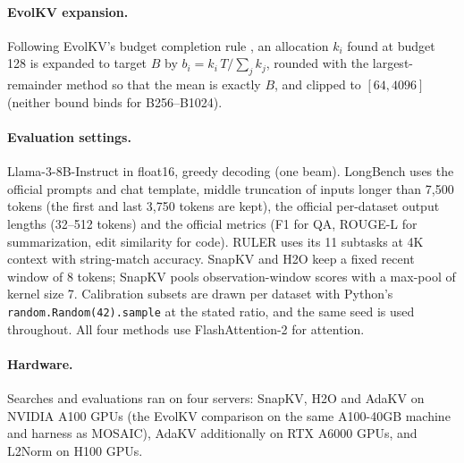 \paragraph{EvolKV expansion.} Following EvolKV's budget completion rule \citep{yu2025evolkv}, an allocation $k_i$ found at budget 128 is expanded to target $B$ by $b_i = k_i\,T / \sum_j k_j$, rounded with the largest-remainder method so that the mean is exactly $B$, and clipped to $[64, 4096]$ (neither bound binds for B256--B1024).

\paragraph{Evaluation settings.} Llama-3-8B-Instruct in float16, greedy decoding (one beam). LongBench uses the official prompts and chat template, middle truncation of inputs longer than 7{,}500 tokens (the first and last 3{,}750 tokens are kept), the official per-dataset output lengths (32--512 tokens) and the official metrics (F1 for QA, ROUGE-L for summarization, edit similarity for code). RULER uses its 11 subtasks at 4K context with string-match accuracy. SnapKV and H2O keep a fixed recent window of 8 tokens; SnapKV pools observation-window scores with a max-pool of kernel size 7. Calibration subsets are drawn per dataset with Python's \texttt{random.Random(42).sample} at the stated ratio, and the same seed is used throughout. All four methods use FlashAttention-2 for attention.

\paragraph{Hardware.} Searches and evaluations ran on four servers: SnapKV, H2O and AdaKV on NVIDIA A100 GPUs (the EvolKV comparison on the same A100-40GB machine and harness as MOSAIC), AdaKV additionally on RTX A6000 GPUs, and L2Norm on H100 GPUs.
